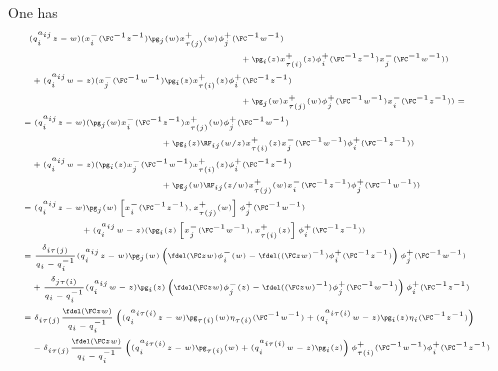 \documentclass[reqno]{amsart}
\numberwithin{equation}{section}
\begin{document}
One has
\begin{equation}\label{eq:quadratic-A-B}
\tiny
\begin{split}
(q_i^{a_{ij}}z-w)&(x_i^-(\FC^{-1}z^{-1})\pg_j(w)x_{\tau(j)}^+(w)\phi^+_j(\FC^{-1}w^{-1})\\
&\hspace{4cm}+\pg_i(z)x_{\tau(i)}^+(z)\phi^+_i(\FC^{-1}z^{-1})x_j^-(\FC^{-1}w^{-1}))\\
&\hspace{-1.25cm}+(q_i^{a_{ij}}w-z)(x_j^-(\FC^{-1}w^{-1})\pg_i(z)x_{\tau(i)}^+(z)\phi^+_i(\FC^{-1}z^{-1})\\
&\hspace{4cm}+\pg_j(w)x_{\tau(j)}^+(w)\phi^+_j(\FC^{-1}w^{-1})x_i^-(\FC^{-1}z^{-1}))=\\
&\hspace{-1.5cm}=(q_i^{a_{ij}}z-w)(\pg_j(w)x_i^-(\FC^{-1}z^{-1})x_{\tau(j)}^+(w)\phi^+_j(\FC^{-1}w^{-1})\\
&\hspace{2cm}+\pg_i(z)\RF_{ij}(w/z)x_{\tau(i)}^+(z)x_j^-(\FC^{-1}w^{-1})\phi^+_i(\FC^{-1}z^{-1}))\\
&\hspace{-1.25cm}+(q_i^{a_{ij}}w-z)(\pg_i(z)x_j^-(\FC^{-1}w^{-1})x_{\tau(i)}^+(z)\phi^+_i(\FC^{-1}z^{-1})\\
&\hspace{2cm}+\pg_j(w)\RF_{ij}(z/w)x_{\tau(j)}^+(w)x_i^-(\FC^{-1}z^{-1})\phi^+_j(\FC^{-1}w^{-1}))\\
&\hspace{-1.5cm}=(q_i^{a_{ij}}z-w)\pg_j(w)\left[x_i^-(\FC^{-1}z^{-1}),x_{\tau(j)}^+(w)\right]\phi^+_j(\FC^{-1}w^{-1})\\
&\hspace{0cm}+(q_i^{a_{ij}}w-z)(\pg_i(z)\left[x_j^-(\FC^{-1}w^{-1}),x_{\tau(i)}^+(z)\right]\phi^+_i(\FC^{-1}z^{-1}))\\
&\hspace{-1.5cm}=\frac{\delta_{i\tau(j)}}{q_i-q_i^{-1}}(q_i^{a_{ij}}z-w)\pg_j(w)\left(\fdel(\FC zw)\phi^-_i(w)
-\fdel((\FC zw)^{-1})\phi^+_i(\FC^{-1}z^{-1})\right)\phi^+_j(\FC^{-1}w^{-1})\\
&\hspace{-1.25cm}+\frac{\delta_{j\tau(i)}}{q_i-q_i^{-1}}(q_i^{a_{ij}}w-z)\pg_i(z)\left(\fdel(\FC zw)\phi^-_{j}(z)
-\fdel((\FC zw)^{-1})\phi^+_{j}(\FC^{-1}w^{-1})\right)\phi^+_i(\FC^{-1}z^{-1})\\
&\hspace{-1.5cm}=\delta_{i\tau(j)}\frac{\fdel(\FC zw)}{q_i-q_i^{-1}}\left((q_i^{a_{i\tau(i)}}z-w)\pg_{\tau(i)}(w)\eta_{\tau(i)}(\FC^{-1}w^{-1})
+(q_i^{a_{i\tau(i)}}w-z)\pg_i(z)\eta_{i}(\FC^{-1}z^{-1})\right)\\
&\hspace{-1.25cm}-\delta_{i\tau(j)}\frac{\fdel(\FC zw)}{q_i-q_i^{-1}}
\left(
(q_i^{a_{i\tau(i)}}z-w)\pg_{\tau(i)}(w)+(q_i^{a_{i\tau(i)}}w-z)\pg_i(z)
\right)
\phi^+_{\tau(i)}(\FC^{-1}w^{-1})\phi^+_i(\FC^{-1}z^{-1})
\end{split}	
\end{equation}
\end{document}

